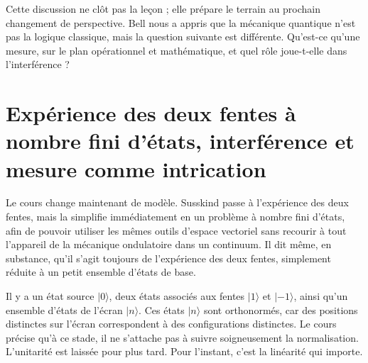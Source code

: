 \begin{classroomqa}
\end{classroomqa}

Cette discussion ne clôt pas la leçon ; elle prépare le terrain au prochain changement de perspective. Bell nous a appris que la mécanique quantique n’est pas la logique classique, mais la question suivante est différente. Qu’est-ce qu’une mesure, sur le plan opérationnel et mathématique, et quel rôle joue-t-elle dans l’interférence ?

\section{Expérience des deux fentes à nombre fini d’états, interférence et mesure comme intrication}

Le cours change maintenant de modèle. Susskind passe à l’expérience des deux fentes, mais la simplifie immédiatement en un problème à nombre fini d’états, afin de pouvoir utiliser les mêmes outils d’espace vectoriel sans recourir à tout l’appareil de la mécanique ondulatoire dans un continuum. Il dit même, en substance, qu’il s’agit toujours de l’expérience des deux fentes, simplement réduite à un petit ensemble d’états de base.

Il y a un état source \(|0\rangle\), deux états associés aux fentes \(|1\rangle\) et \(|-1\rangle\), ainsi qu’un ensemble d’états de l’écran \(|n\rangle\). Ces états \(|n\rangle\) sont orthonormés, car des positions distinctes sur l’écran correspondent à des configurations distinctes. Le cours précise qu’à ce stade, il ne s’attache pas à suivre soigneusement la normalisation. L’unitarité est laissée pour plus tard. Pour l’instant, c’est la linéarité qui importe.

